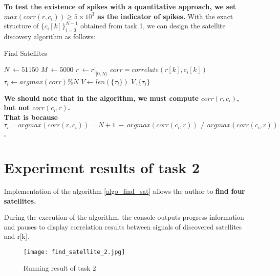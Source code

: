 \documentclass{article}
\begin{document}
\textbf{To test the existence of spikes with a quantitative approach, we set $max(corr(r,c_i))\geq 5\times 10^3$ as the indicator of spikes.}
With the exact structure of $\{c_i[k]\}_{i=0}^{N-1}$ obtained from task 1, 
we can design the satellite discovery algorithm as follows:

\begin{algorithm}
    \caption{Find Satellites}
    \label{algo_find_sat}
    \begin{algorithmic} 
    \STATE $N \ \leftarrow 51150$
    \STATE $M \ \leftarrow 5000$
    \STATE $r \ \leftarrow r\vert_{[0,N)}$
        \STATE $corr=correlate(r[k],c_i[k])$
            \STATE $\tau_i \leftarrow argmax(corr)\%N$ 
        \ENDIF
    \ENDFOR
    \STATE $V \leftarrow len(\{\tau_i\})$
    \RETURN $V,\{\tau_i\}$
\end{algorithmic}
\end{algorithm}

\par \textbf{We should note that in the algorithm, we must compute $corr(r,c_i)$, but not $corr(c_i,r)$.
\\\indent That is because $\tau_i=argmax(corr(r,c_i))=N+1\ - \ argmax(corr(c_i,r)) \ne argmax(corr(c_i,r))$.}

\section{Experiment results of task 2}
\par Implementation of the algorithm \ref{algo_find_sat} allows the author to \textbf{find four satellites.}
\par During the execution of the algorithm, the console outputs progress information and pauses to display correlation results
between signals of discovered satellites and r[k].

\begin{figure}[H]
\texttt{[image: find\_satellite\_2.jpg]}
\caption{Running result of task 2}
\end{figure}
\end{document}
